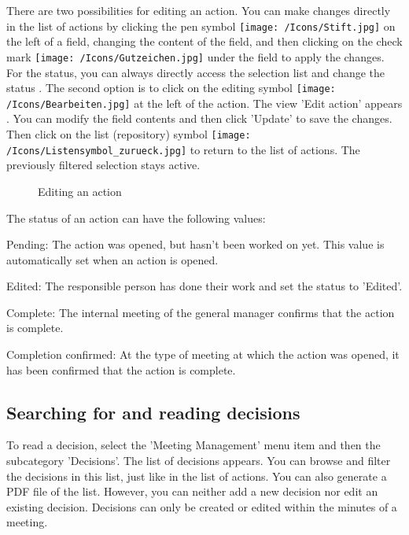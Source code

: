 There are two possibilities for editing an action. You can make changes directly in the list of actions by clicking the pen symbol \texttt{[image: /Icons/Stift.jpg]}  on the left of a field, changing the content of the field, and then clicking on the check mark \texttt{[image: /Icons/Gutzeichen.jpg]}  under the field to apply the changes. For the status, you can always directly access the selection list and change the status . The second option is to click on the editing symbol \texttt{[image: /Icons/Bearbeiten.jpg]}  at the left of the action. The view 'Edit action' appears . You can modify the field contents and then click 'Update' to save the changes. Then click on the list (repository) symbol \texttt{[image: /Icons/Listensymbol\_zurueck.jpg]}  to return to the list of actions. The previously filtered selection stays active.


\begin{figure}[H]
\caption{Editing an action}
\end{figure}

The status of an action can have the following values:

\begin{compactitem}
\item
Pending: The action was opened, but hasn't been worked on yet. This value is automatically set when an action is opened.
\item
Edited: The responsible person has done their work and set the status to 'Edited'.
\item
Complete: The internal meeting of the general manager confirms that the action is complete.
\item
Completion confirmed: At the type of meeting at which the action was opened, it has been confirmed that the action is complete.
\end{compactitem}

\subsection{Searching for and reading decisions}

To read a decision, select the 'Meeting Management' menu item and then the subcategory 'Decisions'. The list of decisions appears. You can browse and filter the decisions in this list, just like in the list of actions. You can also generate a PDF file of the list. However, you can neither add a new decision nor edit an existing decision. Decisions can only be created or edited within the minutes of a meeting.

